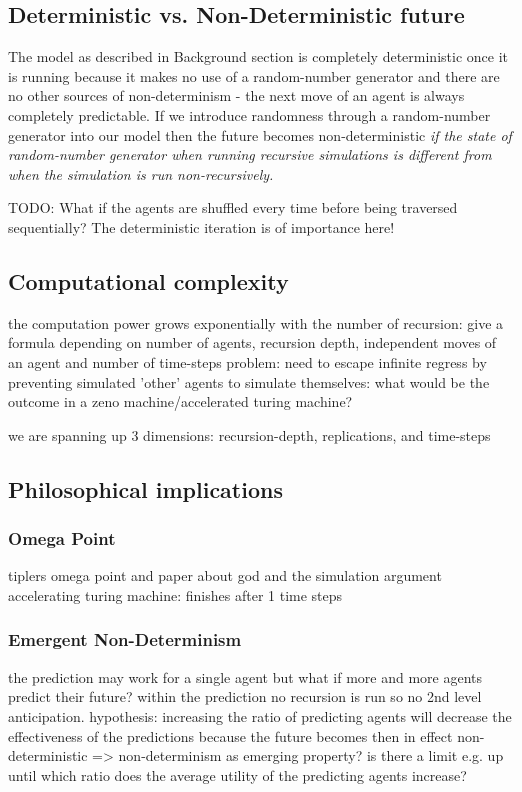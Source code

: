 \subsection{Deterministic vs. Non-Deterministic future}
The model as described in Background section is completely deterministic once it is running because it makes no use of a random-number generator and there are no other sources of non-determinism - the next move of an agent is always completely predictable. If we introduce randomness through a random-number generator into our model then the future becomes non-deterministic \textit{if the state of random-number generator when running recursive simulations is different from when the simulation is run non-recursively.}

TODO: What if the agents are shuffled every time before being traversed sequentially? The deterministic iteration is of importance here!

\subsection{Computational complexity}
the computation power grows exponentially with the number of recursion: give a formula depending on number of agents, recursion depth, independent moves of an agent and number of time-steps 
problem: need to escape infinite regress by preventing simulated 'other' agents to simulate themselves: what would be the outcome in a zeno machine/accelerated turing machine?

we are spanning up 3 dimensions: recursion-depth, replications, and time-steps

\subsection{Philosophical implications}

\subsubsection{Omega Point}
tiplers omega point and paper about god and the simulation argument
accelerating turing machine: finishes after 1 time steps

\subsubsection{Emergent Non-Determinism}
the prediction may work for a single agent but what if more and more agents predict their future? within the prediction no recursion is run so no 2nd level anticipation. 
hypothesis: increasing the ratio of predicting agents will decrease the effectiveness of the predictions because the future becomes then in effect non-deterministic => non-determinism as emerging property? is there a limit e.g. up until which ratio does the average utility of the predicting agents increase?

